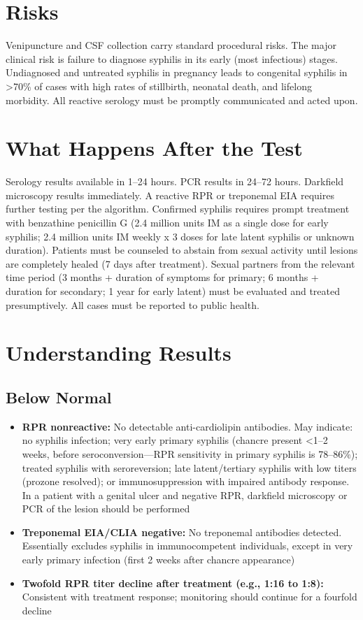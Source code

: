 \section*{Risks}
Venipuncture and CSF collection carry standard procedural risks. The major clinical risk is failure to diagnose syphilis in its early (most infectious) stages. Undiagnosed and untreated syphilis in pregnancy leads to congenital syphilis in >70\% of cases with high rates of stillbirth, neonatal death, and lifelong morbidity. All reactive serology must be promptly communicated and acted upon.

\section*{What Happens After the Test}
Serology results available in 1--24 hours. PCR results in 24--72 hours. Darkfield microscopy results immediately. A reactive RPR or treponemal EIA requires further testing per the algorithm. Confirmed syphilis requires prompt treatment with benzathine penicillin G (2.4 million units IM as a single dose for early syphilis; 2.4 million units IM weekly x 3 doses for late latent syphilis or unknown duration). Patients must be counseled to abstain from sexual activity until lesions are completely healed (7 days after treatment). Sexual partners from the relevant time period (3 months + duration of symptoms for primary; 6 months + duration for secondary; 1 year for early latent) must be evaluated and treated presumptively. All cases must be reported to public health.

\section*{Understanding Results}

\subsection*{Below Normal}
\begin{itemize}
  \item \textbf{RPR nonreactive:} No detectable anti-cardiolipin antibodies. May indicate: no syphilis infection; very early primary syphilis (chancre present <1--2 weeks, before seroconversion---RPR sensitivity in primary syphilis is 78--86\%); treated syphilis with seroreversion; late latent/tertiary syphilis with low titers (prozone resolved); or immunosuppression with impaired antibody response. In a patient with a genital ulcer and negative RPR, darkfield microscopy or PCR of the lesion should be performed
  \item \textbf{Treponemal EIA/CLIA negative:} No treponemal antibodies detected. Essentially excludes syphilis in immunocompetent individuals, except in very early primary infection (first 2 weeks after chancre appearance)
  \item \textbf{Twofold RPR titer decline after treatment (e.g., 1:16 to 1:8):} Consistent with treatment response; monitoring should continue for a fourfold decline
\end{itemize}


